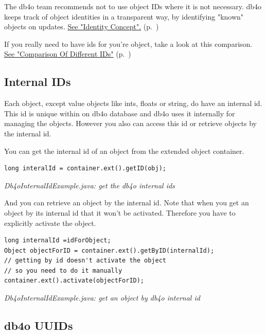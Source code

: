 The db4o team recommends not to use object IDs where it is not necessary. db4o keeps track of object identities in a transparent way, by identifying "known" objects on updates. \hyperref[ref:basics-identity-concept]{See "Identity Concept".} (p.~\pageref{ref:basics-identity-concept})

If you really need to have ids for you're object, take a look at this comparison. \hyperref[ref:platform-specific-issues-disconnected-objects-comparison-of-ids]{See "Comparison Of Different IDs"} (p.~\pageref{ref:platform-specific-issues-disconnected-objects-comparison-of-ids})

\subsection*{Internal IDs}

Each object, except value objects like ints, floats or string, do have an internal id. This id is unique within on db4o database and db4o uses it internally for managing the objects. However you also can access this id or retrieve objects by the internal id.

You can get the internal id of an object from the extended object container.

\begin{lstlisting}
long interalId = container.ext().getID(obj);
\end{lstlisting}

{\small\itshape Db4oInternalIdExample.java: get the db4o internal ids\par}
\medskip

And you can retrieve an object by the internal id. Note that when you get an object by its internal id that it won't be activated. Therefore you have to explicitly activate the object.

\begin{lstlisting}
long internalId =idForObject;
Object objectForID = container.ext().getByID(internalId);
// getting by id doesn't activate the object
// so you need to do it manually
container.ext().activate(objectForID);
\end{lstlisting}

{\small\itshape Db4oInternalIdExample.java: get an object by db4o internal id\par}
\medskip

\subsection*{db4o UUIDs}

